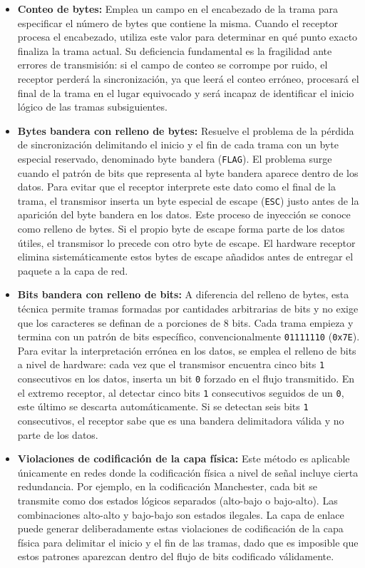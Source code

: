 \begin{itemize}
  \item \textbf{Conteo de bytes:} 
  Emplea un campo en el encabezado de la trama para especificar el número de bytes que contiene la misma. Cuando el receptor procesa el encabezado, utiliza este valor para determinar en qué punto exacto finaliza la trama actual. Su deficiencia fundamental es la fragilidad ante errores de transmisión: si el campo de conteo se corrompe por ruido, el receptor perderá la sincronización, ya que leerá el conteo erróneo, procesará el final de la trama en el lugar equivocado y será incapaz de identificar el inicio lógico de las tramas subsiguientes.

  \item \textbf{Bytes bandera con relleno de bytes:} 
  Resuelve el problema de la pérdida de sincronización delimitando el inicio y el fin de cada trama con un byte especial reservado, denominado byte bandera (\texttt{FLAG}). El problema surge cuando el patrón de bits que representa al byte bandera aparece dentro de los datos. Para evitar que el receptor interprete este dato como el final de la trama, el transmisor inserta un byte especial de escape (\texttt{ESC}) justo antes de la aparición del byte bandera en los datos. Este proceso de inyección se conoce como relleno de bytes. Si el propio byte de escape forma parte de los datos útiles, el transmisor lo precede con otro byte de escape. El hardware receptor elimina sistemáticamente estos bytes de escape añadidos antes de entregar el paquete a la capa de red.

  \item \textbf{Bits bandera con relleno de bits:} 
  A diferencia del relleno de bytes, esta técnica permite tramas formadas por cantidades arbitrarias de bits y no exige que los caracteres se definan de a porciones de 8 bits. Cada trama empieza y termina con un patrón de bits específico, convencionalmente \texttt{01111110} (\texttt{0x7E}). Para evitar la interpretación errónea en los datos, se emplea el relleno de bits a nivel de hardware: cada vez que el transmisor encuentra cinco bits \texttt{1} consecutivos en los datos, inserta un bit \texttt{0} forzado en el flujo transmitido. En el extremo receptor, al detectar cinco bits \texttt{1} consecutivos seguidos de un \texttt{0}, este último se descarta automáticamente. Si se detectan seis bits \texttt{1} consecutivos, el receptor sabe que es una bandera delimitadora válida y no parte de los datos.

  \item \textbf{Violaciones de codificación de la capa física:} 
  Este método es aplicable únicamente en redes donde la codificación física a nivel de señal incluye cierta redundancia. Por ejemplo, en la codificación Manchester, cada bit se transmite como dos estados lógicos separados (alto-bajo o bajo-alto). Las combinaciones alto-alto y bajo-bajo son estados ilegales. La capa de enlace puede generar deliberadamente estas violaciones de codificación de la capa física para delimitar el inicio y el fin de las tramas, dado que es imposible que estos patrones aparezcan dentro del flujo de bits codificado válidamente.
\end{itemize}

